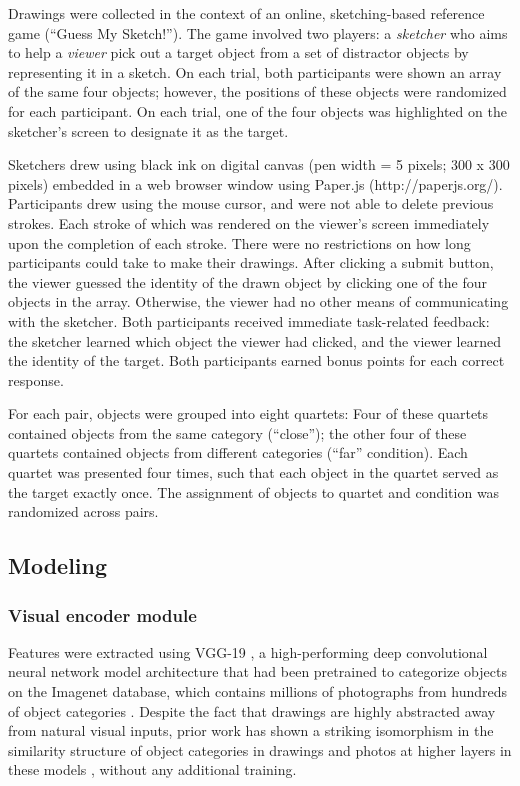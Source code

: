 \documentclass[9pt,twocolumn,twoside]{pnas-new}
\begin{document}
Drawings were collected in the context of an online, sketching-based reference game (``Guess My Sketch!''). The game involved two players: a \textit{sketcher} who aims to help a \textit{viewer} pick out a target object from a set of distractor objects by representing it in a sketch. On each trial, both participants were shown an array of the same four objects; however, the positions of these objects were randomized for each participant. On each trial, one of the four objects was highlighted on the sketcher's screen to designate it as the target. 

Sketchers drew using black ink on digital canvas (pen width = 5 pixels; 300 x 300 pixels) embedded in a web browser window using Paper.js (http://paperjs.org/). Participants drew using the mouse cursor, and were not able to delete previous strokes. Each stroke of which was rendered on the viewer's screen immediately upon the completion of each stroke. There were no restrictions on how long participants could take to make their drawings. After clicking a submit button, the viewer guessed the identity of the drawn object by clicking one of the four objects in the array. Otherwise, the viewer had no other means of communicating with the sketcher. Both participants received immediate task-related feedback: the sketcher learned which object the viewer had clicked, and the viewer learned the identity of the target. Both participants earned bonus points for each correct response. 

For each pair, objects were grouped into eight quartets: Four of these quartets contained objects from the same category (``close''); the other four of these quartets contained objects from different categories (``far'' condition). Each quartet was presented four times, such that each object in the quartet served as the target exactly once. The assignment of objects to quartet and condition was randomized across pairs. 

\subsection*{Modeling}

\subsubsection*{Visual encoder module}

Features were extracted using VGG-19 \cite{simonyan2014very}, a high-performing deep convolutional neural network model architecture that had been pretrained to categorize objects on the Imagenet database, which contains millions of photographs from hundreds of object categories \cite{deng2009imagenet}. Despite the fact that drawings are highly abstracted away from natural visual inputs, prior work has shown a striking isomorphism in the similarity structure \cite{kriegeskorte2008matching} of object categories in drawings and photos at higher layers in these models \cite[]{fan2015common}, without any additional training.
\end{document}
